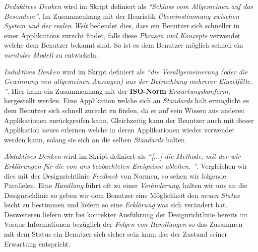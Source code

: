 \textit{Deduktives Denken} wird im Skript definiert als \textit{``Schluss vom
Allgemeinen auf das Besondere''}. Im Zusammenhang mit der Heuristik
\textit{Übereinstimmung zwischen System und der realen Welt} bedeudet dies, dass
ein Benutzer sich schneller in einer Applikaitons zurecht findet, falls diese
\textit{Phrasen und Konzepte} verwendet welche dem Benutzer bekannt sind. So ist
es dem Benutzer möglich schnell ein \textit{mentales Modell} zu entwickeln. 
\newline

\textit{Induktives Denken} wird im Skript definiert als \textit{``die
Verallgemeinerung (oder die Gewinnung von allgemeinen Aussagen) aus der
Betrachtung mehrerer Einzelfälle. ''}. Hier kann ein Zusammenhang mit
der \textbf{ISO-Norm} \textit{Erwartungskonform}, hergestellt werden. Eine
Applikation welche sich an \textit{Standards} hält ermöglicht es dem Benutzer
sich schnell zurecht zu finden, da er auf sein Wissen aus anderen Applikationen
zurückgreifen kann. Gleichzeitig kann der Benutzer auch mit dieser Applikation
neues erlernen welche in deren Applikationen wieder verwendet werden kann,
solang sie sich an die selben \textit{Standards} halten.

\textit{Abduktives Denken} wird im Skript definiert als \textit{``[...] die
Methode, mit der wir Erklärungen für die von uns beobachteten Ereignisse
ableiten. ''}. Vergleichen wir dies mit der Designrichtlinie \textit{Feedback}
von Normen, so sehen wir folgende Parallelen. Eine \textit{Handlung} führt oft zu einer
\textit{Veränderung}, halten wir uns an die Designrichlinie so geben wir dem Benutzer
eine Möglichkeit den \textit{neuen Status} leicht zu bestimmen und liefern so
eine \textit{Erklärung} was sich verändert hat. Desweiteren liefern wir bei
konrekter Ausführung der Designrichtlinie bereits im Voraus Informationen
bezüglich der \textit{Folgen von Handlungen} so das Zusammen mit dem Status ein
Benutzer sich sicher sein kann das der Zustand seiner Erwartung entspricht. 
 
